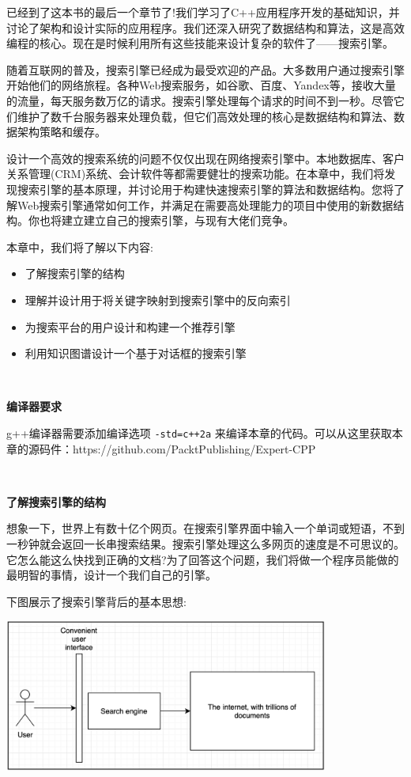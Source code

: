 已经到了这本书的最后一个章节了!我们学习了C++应用程序开发的基础知识，并讨论了架构和设计实际的应用程序。我们还深入研究了数据结构和算法，这是高效编程的核心。现在是时候利用所有这些技能来设计复杂的软件了——搜索引擎。 \par
随着互联网的普及，搜索引擎已经成为最受欢迎的产品。大多数用户通过搜索引擎开始他们的网络旅程。各种Web搜索服务，如谷歌、百度、Yandex等，接收大量的流量，每天服务数万亿的请求。搜索引擎处理每个请求的时间不到一秒。尽管它们维护了数千台服务器来处理负载，但它们高效处理的核心是数据结构和算法、数据架构策略和缓存。 \par
设计一个高效的搜索系统的问题不仅仅出现在网络搜索引擎中。本地数据库、客户关系管理(CRM)系统、会计软件等都需要健壮的搜索功能。在本章中，我们将发现搜索引擎的基本原理，并讨论用于构建快速搜索引擎的算法和数据结构。您将了解Web搜索引擎通常如何工作，并满足在需要高处理能力的项目中使用的新数据结构。你也将建立建立自己的搜索引擎，与现有大佬们竞争。 \par

本章中，我们将了解以下内容: \par

\begin{itemize}
	\item 了解搜索引擎的结构
	\item 理解并设计用于将关键字映射到搜索引擎中的反向索引
	\item 为搜索平台的用户设计和构建一个推荐引擎
	\item 利用知识图谱设计一个基于对话框的搜索引擎
\end{itemize}

\noindent\textbf{}\ \par
\textbf{编译器要求} \ \par
g++编译器需要添加编译选项 \texttt{-std=c++2a} 来编译本章的代码。可以从这里获取本章的源码件：https:/​/github.​com/PacktPublishing/Expert-CPP \par

\noindent\textbf{}\ \par
\textbf{了解搜索引擎的结构} \ \par
想象一下，世界上有数十亿个网页。在搜索引擎界面中输入一个单词或短语，不到一秒钟就会返回一长串搜索结果。搜索引擎处理这么多网页的速度是不可思议的。它怎么能这么快找到正确的文档?为了回答这个问题，我们将做一个程序员能做的最明智的事情，设计一个我们自己的引擎。 \par
下图展示了搜索引擎背后的基本思想: \par

\begin{center}
	\includegraphics[width=0.8\textwidth]{content/Section-3/Chapter-16/1}
\end{center}

